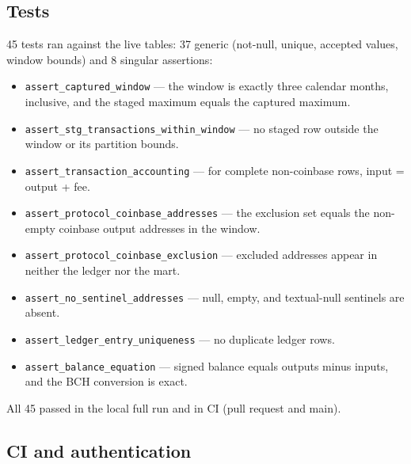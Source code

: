 \documentclass[10pt,a4paper]{article}
\newcommand{\code}[1]{\nolinkurl{#1}}
\begin{document}
\subsection{Tests}

45 tests ran against the live tables: 37 generic (not-null, unique,
accepted values, window bounds) and 8 singular assertions:

\begin{itemize}
  \item \code{assert_captured_window} --- the window is exactly three
        calendar months, inclusive, and the staged maximum equals the
        captured maximum.
  \item \code{assert_stg_transactions_within_window} --- no staged
        row outside the window or its partition bounds.
  \item \code{assert_transaction_accounting} --- for complete
        non-coinbase rows, input = output + fee.
  \item \code{assert_protocol_coinbase_addresses} --- the exclusion
        set equals the non-empty coinbase output addresses in the window.
  \item \code{assert_protocol_coinbase_exclusion} --- excluded
        addresses appear in neither the ledger nor the mart.
  \item \code{assert_no_sentinel_addresses} --- null, empty, and
        textual-null sentinels are absent.
  \item \code{assert_ledger_entry_uniqueness} --- no duplicate ledger
        rows.
  \item \code{assert_balance_equation} --- signed balance equals
        outputs minus inputs, and the BCH conversion is exact.
\end{itemize}

All 45 passed in the local full run and in CI (pull request and main).

\subsection{CI and authentication}
\end{document}
